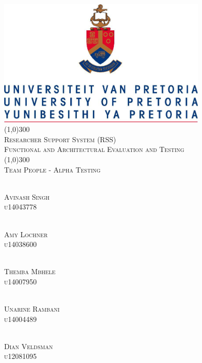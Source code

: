\documentclass{article}
\begin{document}
	
	\begin{titlepage}
		\begin{center}
			\includegraphics[width=10cm]{UP.jpg}  \\
			[1cm]
			\line(1,0){300} \\
			[0.3cm]
			\textsc{\Large
				Researcher Support System (RSS)\\
				Functional and Architectural Evaluation and Testing
			}\\
			[0.1cm]
			\line(1,0){300} \\
			[0.4cm]
			\textsc{\Large
				Team People - Alpha Testing
			} \\
			
			
			
		\end{center}
		\begin{center}
			
			\textsc{\large\\
				Avinash Singh\\ 
				u14043778\\ 
			}
			
			\textsc{\large\\
				Amy Lochner\\
				u14038600\\ 
			}
			
			\textsc{\large\\
				Themba Mbhele\\
				u14007950\\ 
			}
			
			\textsc{\large\\
				Unarine Rambani\\
				u14004489 \\
			}
			
			\textsc{\large\\
				Dian Veldsman\\
				u12081095\\
			}
			
		\end{center}
	\end{titlepage}
	
\end{document}
